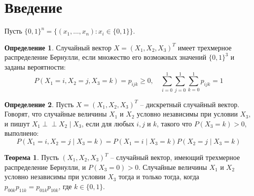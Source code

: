 \documentclass{article}
\theoremstyle{definition}
\newtheorem{definition}{Определение}[section]
\newtheorem{theorem}{Теорема}[section]
\def\ci{\perp\!\!\!\perp}
\begin{document}
\section{Введение}

Пусть $\{0,1\}^n = \{(x_1,\ldots,x_n): x_i \in \{0,1\} \}$.

\begin{definition}
    Случайный вектор $X=(X_1, X_2, X_3)^T$ имеет трехмерное распределение Бернулли,
    если множество его возможных значений $\{0,1\}^3$ и заданы вероятности:
    $$P(X_1=i,X_2=j,X_3=k)=p_{ijk} \geq 0, \quad \sum_{i=0}^{1}\sum_{j=0}^{1}\sum_{k=0}^{1}p_{ijk}=1$$
\end{definition}

\begin{definition}
    Пусть $X=(X_1,X_2,X_3)^T$ -- дискретный случайный вектор.
    Говорят, что случайные величины $X_1$ и $X_2$ условно независимы при условии $X_3$,
    и пишут $X_1 \ci X_2 \mid X_3$, если
    для любых $i,j$ и $k$, такого что $P(X_3=k)>0$, выполнено:
    $$
        P(X_1=i, X_2=j \mid X_3 = k) = P(X_1=i \mid X_3 = k) P(X_2=j \mid X_3 = k)
    $$
\end{definition}

\begin{theorem}\label{thm1}
    Пусть $(X_1,X_2,X_3)^T$ -- случайный вектор, имеющий трехмерное распределение Бернулли, и $P(X_3=0)>0$.
    Случайные величины $X_1$ и $X_2$ условно независимы при условии $X_3$ тогда и только тогда, когда
    $p_{00k}p_{11k}=p_{01k}p_{10k}$, где $k \in \{0,1\}$.
\end{theorem}
\end{document}
